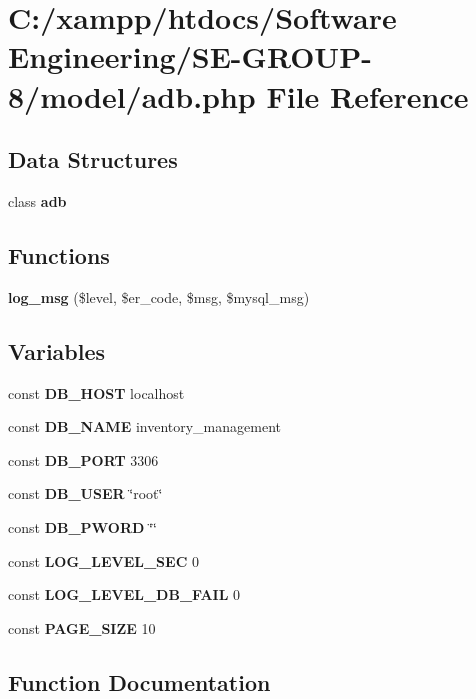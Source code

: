 \section{C\+:/xampp/htdocs/\+Software Engineering/\+S\+E-\/\+G\+R\+O\+U\+P-\/8/model/adb.php File Reference}
\label{adb_8php}
\subsection*{Data Structures}
\begin{DoxyCompactItemize}
\item 
class {\bf adb}
\end{DoxyCompactItemize}
\subsection*{Functions}
\begin{DoxyCompactItemize}
\item 
{\bf log\+\_\+msg} (\$level, \$er\+\_\+code, \$msg, \$mysql\+\_\+msg)
\end{DoxyCompactItemize}
\subsection*{Variables}
\begin{DoxyCompactItemize}
\item 
const {\bf D\+B\+\_\+\+H\+O\+S\+T} \textquotesingle{}localhost\textquotesingle{}
\item 
const {\bf D\+B\+\_\+\+N\+A\+M\+E} \textquotesingle{}inventory\+\_\+management\textquotesingle{}
\item 
const {\bf D\+B\+\_\+\+P\+O\+R\+T} 3306
\item 
const {\bf D\+B\+\_\+\+U\+S\+E\+R} \char`\"{}root\char`\"{}
\item 
const {\bf D\+B\+\_\+\+P\+W\+O\+R\+D} \char`\"{}\char`\"{}
\item 
const {\bf L\+O\+G\+\_\+\+L\+E\+V\+E\+L\+\_\+\+S\+E\+C} 0
\item 
const {\bf L\+O\+G\+\_\+\+L\+E\+V\+E\+L\+\_\+\+D\+B\+\_\+\+F\+A\+I\+L} 0
\item 
const {\bf P\+A\+G\+E\+\_\+\+S\+I\+Z\+E} 10
\end{DoxyCompactItemize}


\subsection{Function Documentation}
